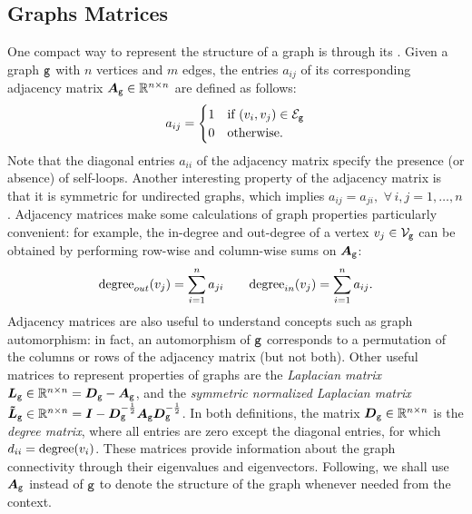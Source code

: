 \subsection{Graphs Matrices} \label{sec:adj-matrix}
One compact way to represent the structure of a graph is through its  . Given a graph $\mathtt{g}$ with $n$ vertices and $m$ edges, the entries $a_{ij}$ of its corresponding  adjacency matrix $\AdjMatrix{g} \in \Real^{n \times n}$ are defined as follows:
\[
a_{ij} =
    \begin{cases}
        1  & \text{if } (v_i, v_j) \in \Edges{g}\\
        0  & \text{otherwise.}
    \end{cases}
\]
Note that the diagonal entries $a_{ii}$ of the adjacency matrix specify the presence  (or absence) of self-loops. Another interesting property of the adjacency matrix is that  it is symmetric for undirected graphs, which implies $a_{ij} = a_{ji},$ $\forall\, i, j = 1, \ldots, n$. Adjacency matrices make some calculations of graph properties particularly convenient: for example, the in-degree and out-degree of a vertex $v_j \in \Nodes{g}$
can be obtained by performing row-wise and column-wise sums on $\AdjMatrix{g}$:
$$
\mathrm{degree}_{out}(v_j) = \sum_{i=1}^n a_{ji} \quad \quad \mathrm{degree}_{in}(v_j) = \sum_{i=1}^n a_{ij}.
$$
Adjacency matrices are also useful to understand concepts such as graph automorphism: in fact, an automorphism of $\mathtt{g}$ corresponds to a permutation of the columns or rows of the adjacency matrix (but not both). Other useful matrices to represent properties of graphs are the \emph{Laplacian matrix} $\LaplacianMatrix{g} \in \Real^{n \times n} = \DegreeMatrix{g} - \AdjMatrix{g}$, and the \emph{symmetric normalized Laplacian matrix} $\NormLaplacianMatrix{g} \in \Real^{n \times n} = \Identity - \DegreeMatrix{g}^{-\frac{1}{2}}\AdjMatrix{g}\DegreeMatrix{g}^{-\frac{1}{2}}$. In both definitions, the matrix  $\DegreeMatrix{g} \in \Real^{n \times n}$ is the \emph{degree matrix}, where all entries are zero except the diagonal entries, for which $d_{ii} = \mathrm{degree}(v_i)$. These matrices provide information about the graph connectivity through their eigenvalues and eigenvectors. Following, we shall use $\AdjMatrix{g}$ instead of $\mathtt{g}$ to denote the structure of the graph whenever needed from the context.

